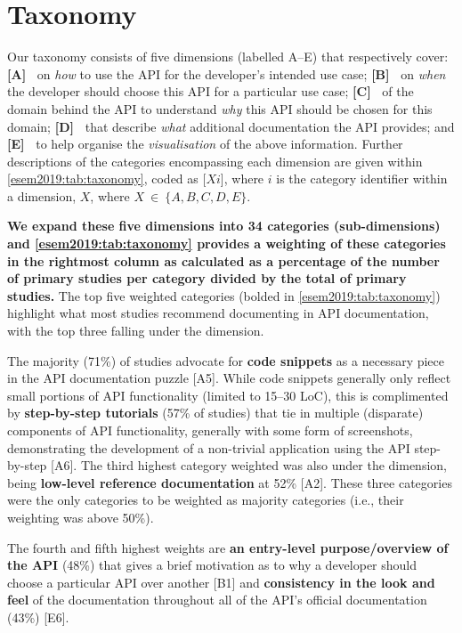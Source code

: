 
\section{Taxonomy}
\label{esem2019:sec:findings}

Our taxonomy consists of five dimensions (labelled A--E) that respectively cover:
\textbf{[A]~\dima{}} on \textit{how} to use the API for the developer's intended use case;
\textbf{[B]~\dimb{}} on \textit{when} the developer should choose this API for a particular use case;
\textbf{[C]~\dimc{}} of the domain behind the API to understand \textit{why} this API should be chosen for this domain;
\textbf{[D]~\dimd{}} that describe \textit{what} additional documentation the API provides; and
 \textbf{[E]~\dime{}} to help organise the \textit{visualisation} of the above information.
Further descriptions of the categories encompassing each dimension are given within \cref{esem2019:tab:taxonomy}, coded as [$Xi$], where $i$ is the category identifier within a dimension, $X$, where $X~\in~\{ A, B, C, D, E \}$.

\textbf{We expand these five dimensions into 34 categories (sub-dimensions) and \cref{esem2019:tab:taxonomy} provides a weighting of these categories in the rightmost column as calculated as a percentage of the number of primary studies per category divided by the total of primary studies.} The top five weighted categories (bolded in \cref{esem2019:tab:taxonomy}) highlight what most studies recommend documenting in API documentation, with the top three falling under the \dima{} dimension.

The majority (71\%) of studies advocate for \textbf{code snippets} as a necessary piece in the API documentation puzzle [A5]. While code snippets generally only reflect small portions of API functionality (limited to 15--30 LoC), this is complimented by \textbf{step-by-step tutorials} (57\% of studies) that tie in multiple (disparate) components of API functionality, generally with some form of screenshots, demonstrating the development of a non-trivial application using the API step-by-step [A6]. The third highest category weighted was also under the \dima{} dimension, being \textbf{low-level reference documentation} at 52\% [A2]. These three categories were the only categories to be weighted as majority categories (i.e., their weighting was above 50\%).

The fourth and fifth highest weights are \textbf{an entry-level purpose/overview of the API} (48\%) that gives a brief motivation as to why a developer should choose a particular API over another [B1] and \textbf{consistency in the look and feel} of the documentation throughout all of the API's official documentation (43\%) [E6].

